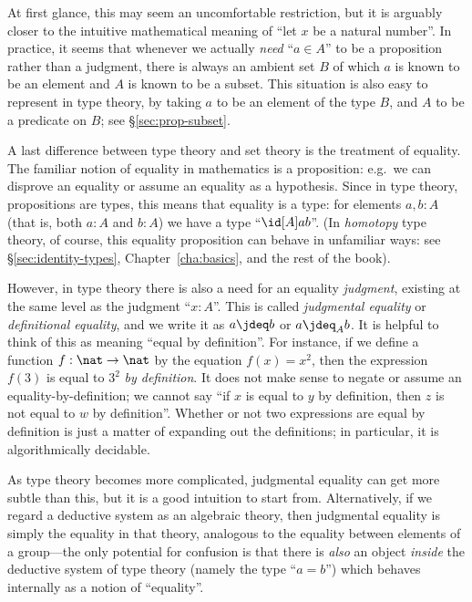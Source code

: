 {At first glance, this may seem an uncomfortable restriction, but it is arguably closer to the intuitive mathematical meaning of ``let $x$ be a natural number''.
In practice, it seems that whenever we actually \emph{need} ``$a\in A$'' to be a proposition rather than a judgment, there is always an ambient set $B$ of which $a$ is known to be an element and $A$ is known to be a subset.
This situation is also easy to represent in type theory, by taking $a$ to be an element of the type $B$, and $A$ to be a predicate on $B$; see \S\ref{sec:prop-subset}.

A last difference between type theory and set theory is the treatment of equality.
The familiar notion of equality in mathematics is a proposition: e.g.\ we can disprove an equality or assume an equality as a hypothesis.
Since in type theory, propositions are types, this means that equality is a type: for elements $a,b:A$ (that is, both $a:A$ and $b:A$) we have a type ``$\id[A]ab$''.
(In \emph{homotopy} type theory, of course, this equality proposition can behave in unfamiliar ways: see \S\ref{sec:identity-types}, Chapter~\ref{cha:basics}, and the rest of the book).

However, in type theory there is also a need for an equality \emph{judgment}, existing at the same level as the judgment ``$x:A$''.
This is called \emph{judgmental equality} or \emph{definitional equality}, and we write it as $a\jdeq b$ or $a \jdeq_A b$.
It is helpful to think of this as meaning ``equal by definition''.
For instance, if we define a function $f:\nat\to\nat$ by the equation $f(x)=x^2$, then the expression $f(3)$ is equal to $3^2$ \emph{by definition}.
It does not make sense to negate or assume an equality-by-definition; we cannot say ``if $x$ is equal to $y$ by definition, then $z$ is not equal to $w$ by definition''.
Whether or not two expressions are equal by definition is just a matter of expanding out the definitions; in particular, it is algorithmically decidable.

As type theory becomes more complicated, judgmental equality can get more subtle than this, but it is a good intuition to start from.
Alternatively, if we regard a deductive system as an algebraic theory, then judgmental equality is simply the equality in that theory, analogous to the equality between elements of a group---the only potential for confusion is that there is \emph{also} an object \emph{inside} the deductive system of type theory (namely the type ``$a=b$'') which behaves internally as a notion of ``equality''.

}
